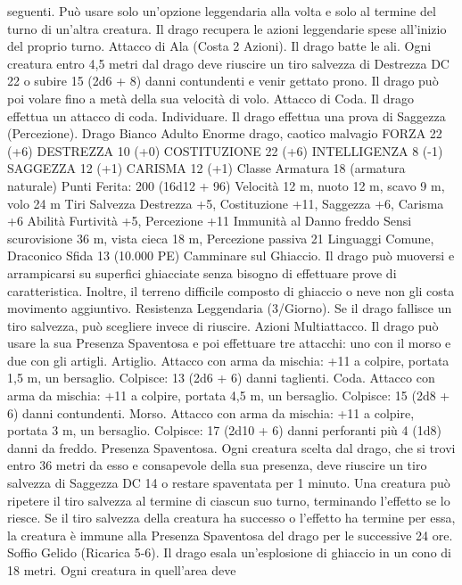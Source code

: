 \begin{multicols}{2}
seguenti. Può usare solo un’opzione leggendaria alla volta e solo
al termine del turno di un’altra creatura. Il drago recupera le
azioni leggendarie spese all’inizio del proprio turno.
Attacco di Ala (Costa 2 Azioni). Il drago batte le ali. Ogni creatura
entro 4,5 metri dal drago deve riuscire un tiro salvezza di Destrezza
DC 22 o subire 15 (2d6 + 8) danni contundenti e venir gettato prono.
Il drago può poi volare fino a metà della sua velocità di volo.
Attacco di Coda. Il drago effettua un attacco di coda.
Individuare. Il drago effettua una prova di Saggezza (Percezione).
Drago Bianco Adulto
Enorme drago, caotico malvagio
FORZA 22 (+6)
DESTREZZA 10 (+0)
COSTITUZIONE 22 (+6)
INTELLIGENZA 8 (-1)
SAGGEZZA 12 (+1)
CARISMA 12 (+1)
Classe Armatura 18 (armatura naturale)
\hspace*{0pt}\hfill{Punti Ferita}: 200 (16d12 + 96)
Velocità 12 m, nuoto 12 m, scavo 9 m, volo 24 m
Tiri Salvezza Destrezza +5, Costituzione +11, Saggezza +6,
Carisma +6
Abilità Furtività +5, Percezione +11
Immunità al Danno freddo
Sensi scurovisione 36 m, vista cieca 18 m, Percezione passiva 21
Linguaggi Comune, Draconico
Sfida 13 (10.000 PE)
Camminare sul Ghiaccio. Il drago può muoversi e arrampicarsi su
superfici ghiacciate senza bisogno di effettuare prove di
caratteristica. Inoltre, il terreno difficile composto di ghiaccio o neve
non gli costa movimento aggiuntivo.
Resistenza Leggendaria (3/Giorno). Se il drago fallisce un tiro
salvezza, può scegliere invece di riuscire.
Azioni
Multiattacco. Il drago può usare la sua Presenza Spaventosa e
poi effettuare tre attacchi: uno con il morso e due con gli artigli.
Artiglio. Attacco con arma da mischia: +11 a colpire, portata 1,5
m, un bersaglio.
Colpisce: 13 (2d6 + 6) danni taglienti.
Coda. Attacco con arma da mischia: +11 a colpire, portata 4,5
m, un bersaglio.
Colpisce: 15 (2d8 + 6) danni contundenti.
Morso. Attacco con arma da mischia: +11 a colpire, portata 3 m,
un bersaglio.
Colpisce: 17 (2d10 + 6) danni perforanti più 4 (1d8) danni da freddo.
Presenza Spaventosa. Ogni creatura scelta dal drago, che si trovi
entro 36 metri da esso e consapevole della sua presenza, deve
riuscire un tiro salvezza di Saggezza DC 14 o restare spaventata per
1 minuto. Una creatura può ripetere il tiro salvezza al termine di
ciascun suo turno, terminando l’effetto se lo riesce. Se il tiro salvezza
della creatura ha successo o l’effetto ha termine per essa, la creatura è
immune alla Presenza Spaventosa del drago per le successive 24 ore.
Soffio Gelido (Ricarica 5-6). Il drago esala un’esplosione di
ghiaccio in un cono di 18 metri. Ogni creatura in quell’area deve

\end{multicols}
